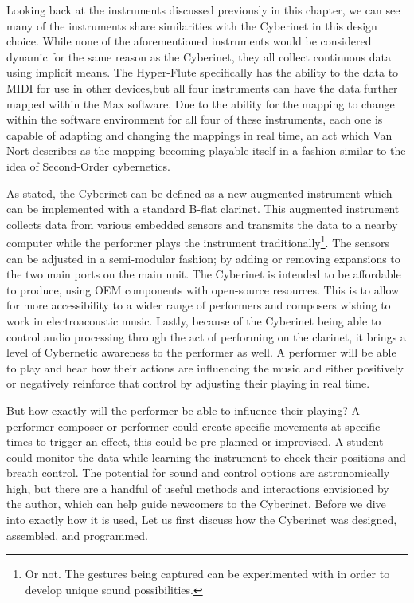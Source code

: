 
Looking back at the instruments discussed previously in this chapter, we can see many of the instruments share similarities with the Cyberinet in this design choice. While none of the aforementioned instruments would be considered dynamic for the same reason as the Cyberinet, they all collect continuous data using implicit means. The Hyper-Flute specifically has the ability to the data to MIDI for use in other devices,but all four instruments can have the data further mapped within the Max software. Due to the ability for the mapping to change within the software environment for all four of these instruments, each one is capable of adapting and changing the mappings in real time, an act which Van Nort describes as the mapping becoming playable itself\cite{vanNortMapping2007} in a fashion similar to the idea of Second-Order cybernetics.


As stated, the Cyberinet can be defined as a new augmented instrument which can be implemented with a standard B-flat clarinet. This augmented instrument collects data from various embedded sensors and transmits the data to a nearby computer while the performer plays the instrument traditionally\footnote{Or not. The gestures being captured can be experimented with in order to develop unique sound possibilities.}. The sensors can be adjusted in a semi-modular fashion; by adding or removing expansions to the two main ports on the main unit. The Cyberinet is intended to be affordable to produce, using OEM components with open-source resources. This is to allow for more accessibility to a wider range of performers and composers wishing to work in electroacoustic music. Lastly, because of the Cyberinet being able to control audio processing through the act of performing on the clarinet, it brings a level of Cybernetic awareness to the performer as well. A performer will be able to play and hear how their actions are influencing the music and either positively or negatively reinforce that control by adjusting their playing in real time. 

But how exactly will the performer be able to influence their playing? A performer composer or performer could create specific movements at specific times to trigger an effect, this could be pre-planned or improvised. A student could monitor the data while learning the instrument to check their positions and breath control. The potential for sound and control options are astronomically high, but there are a handful of useful methods and interactions envisioned by the author, which can help guide newcomers to the Cyberinet. Before we dive into exactly how it is used, Let us first discuss how the Cyberinet was designed, assembled, and programmed.


